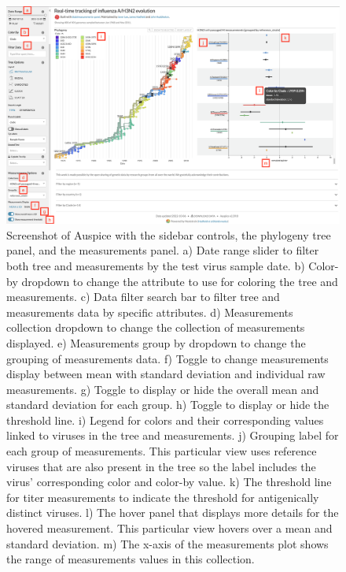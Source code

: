 \documentclass[utf8]{FrontiersinHarvard} %
\begin{document}
\begin{figure}[h!]
  \begin{center}
    \includegraphics[width=\textwidth]{figures/figure-2-screen-shot}
  \end{center}
  \caption{
    Screenshot of Auspice with the sidebar controls, the phylogeny tree panel, and the measurements panel.
a) Date range slider to filter both tree and measurements by the test virus sample date.
b) Color-by dropdown to change the attribute to use for coloring the tree and measurements.
c) Data filter search bar to filter tree and measurements data by specific attributes.
d) Measurements collection dropdown to change the collection of measurements displayed.
e) Measurements group by dropdown to change the grouping of measurements data.
f) Toggle to change measurements display between mean with standard deviation and individual raw measurements.
g) Toggle to display or hide the overall mean and standard deviation for each group.
h) Toggle to display or hide the threshold line.
i) Legend for colors and their corresponding values linked to viruses in the tree and measurements.
j) Grouping label for each group of measurements.
This particular view uses reference viruses that are also present in the tree so the label includes the virus' corresponding color and color-by value.
k) The threshold line for titer measurements to indicate the threshold for antigenically distinct viruses.
l) The hover panel that displays more details for the hovered measurement.
This particular view hovers over a mean and standard deviation.
m) The x-axis of the measurements plot shows the range of measurements values in this collection.
  }\label{fig:2}
\end{figure}
\end{document}
